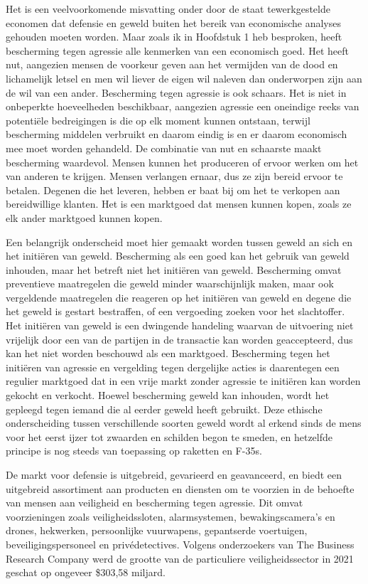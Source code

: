 Het is een veelvoorkomende misvatting onder door de staat tewerkgestelde economen dat defensie en geweld buiten het bereik van economische analyses gehouden moeten worden. Maar zoals ik in Hoofdstuk 1 heb besproken, heeft bescherming tegen agressie alle kenmerken van een economisch goed. Het heeft nut, aangezien mensen de voorkeur geven aan het vermijden van de dood en lichamelijk letsel en men wil liever de eigen wil naleven dan onderworpen zijn aan de wil van een ander. Bescherming tegen agressie is ook schaars. Het is niet in onbeperkte hoeveelheden beschikbaar, aangezien agressie een oneindige reeks van potentiële bedreigingen is die op elk moment kunnen ontstaan, terwijl bescherming middelen verbruikt en daarom eindig is en er daarom economisch mee moet worden gehandeld. De combinatie van nut en schaarste maakt bescherming waardevol. Mensen kunnen het produceren of ervoor werken om het van anderen te krijgen. Mensen verlangen ernaar, dus ze zijn bereid ervoor te betalen. Degenen die het leveren, hebben er baat bij om het te verkopen aan bereidwillige klanten. Het is een marktgoed dat mensen kunnen kopen, zoals ze elk ander marktgoed kunnen kopen.

Een belangrijk onderscheid moet hier gemaakt worden tussen geweld an sich en het initiëren van geweld. Bescherming als een goed kan het gebruik van geweld inhouden, maar het betreft niet het initiëren van geweld. Bescherming omvat preventieve maatregelen die geweld minder waarschijnlijk maken, maar ook vergeldende maatregelen die reageren op het initiëren van geweld en degene die het geweld is gestart bestraffen, of een vergoeding zoeken voor het slachtoffer. Het initiëren van geweld is een dwingende handeling waarvan de uitvoering niet vrijelijk door een van de partijen in de transactie kan worden geaccepteerd, dus kan het niet worden beschouwd als een marktgoed. Bescherming tegen het initiëren van agressie en vergelding tegen dergelijke acties is daarentegen een regulier marktgoed dat in een vrije markt zonder agressie te initiëren kan worden gekocht en verkocht. Hoewel bescherming geweld kan inhouden, wordt het gepleegd tegen iemand die al eerder geweld heeft gebruikt. Deze ethische onderscheiding tussen verschillende soorten geweld wordt al erkend sinds de mens voor het eerst ijzer tot zwaarden en schilden begon te smeden, en hetzelfde principe is nog steeds van toepassing op raketten en F-35s.

De markt voor defensie is uitgebreid, gevarieerd en geavanceerd, en biedt een uitgebreid assortiment aan producten en diensten om te voorzien in de behoefte van mensen aan veiligheid en bescherming tegen agressie. Dit omvat voorzieningen zoals veiligheidssloten, alarmsystemen, bewakingscamera’s en drones, hekwerken, persoonlijke vuurwapens, gepantserde voertuigen, beveiligingspersoneel en privédetectives. Volgens onderzoekers van The Business Research Company werd de grootte van de particuliere veiligheidssector in 2021 geschat op ongeveer \$303,58 miljard.\autocite{197}

